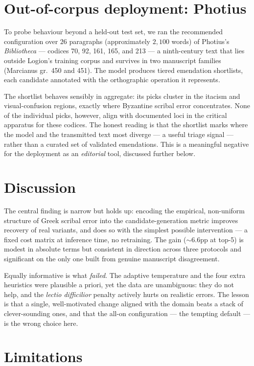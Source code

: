 \documentclass[11pt]{article}
\begin{document}
\section{Out-of-corpus deployment: Photius}

To probe behaviour beyond a held-out test set, we ran the recommended
configuration over $26$ paragraphs (approximately $2{,}100$ words) of Photius's
\emph{Bibliotheca} --- codices 70, 92, 161, 165, and 213 --- a ninth-century text
that lies outside Logion's training corpus and survives in two manuscript families
(Marcianus gr.\ 450 and 451). The model produces tiered emendation shortlists,
each candidate annotated with the orthographic operation it represents.

The shortlist behaves sensibly in aggregate: its picks cluster in the itacism and
visual-confusion regions, exactly where Byzantine scribal error concentrates.
None of the individual picks, however, align with documented loci in the critical
apparatus for these codices. The honest reading is that the
shortlist marks where the model and the transmitted text most
diverge --- a useful triage signal --- rather than a curated set of validated
emendations. This is a meaningful negative for the deployment as an
\emph{editorial} tool, discussed further below.

\section{Discussion}

The central finding is narrow but holds up: encoding the empirical, non-uniform
structure of Greek scribal error into the candidate-generation metric improves
recovery of real variants, and does so with the simplest possible intervention ---
a fixed cost matrix at inference time, no retraining. The gain
($\sim$$6.6$pp at top-5) is modest in absolute terms but consistent in direction
across three protocols and significant on the only one built from genuine
manuscript disagreement.

Equally informative is what \emph{failed}. The adaptive temperature and the four
extra heuristics were plausible a priori, yet the data are unambiguous: they do
not help, and the \emph{lectio difficilior} penalty actively hurts on realistic
errors. The lesson is that a single, well-motivated change aligned with the domain
beats a stack of clever-sounding ones, and that the all-on configuration --- the
tempting default --- is the wrong choice here.

\section{Limitations}
\end{document}
